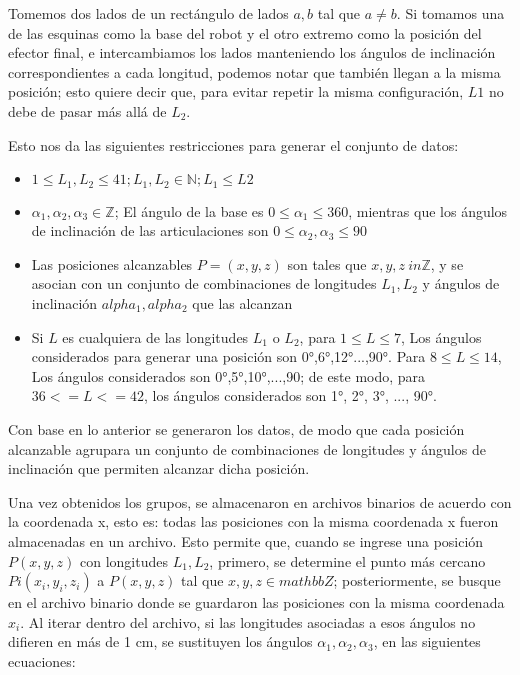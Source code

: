 Tomemos dos lados de un rectángulo de lados $a,b$ tal que $a \neq b$. Si tomamos una de las esquinas como la base del robot y el otro extremo como la posición del efector final, e intercambiamos los lados manteniendo los ángulos de inclinación correspondientes a cada longitud, podemos notar que también llegan a la misma posición; esto quiere decir que, para evitar repetir la misma configuración, $L1$ no debe de pasar más allá de $L_2$.

Esto nos da las siguientes restricciones para generar el conjunto de datos:

\begin{itemize}
	
	\item $ 1 \leq L_1, L_2 \leq 41; L_1, L_2 \in \mathbb{N}; L_1 \leq L2$ 
	
	\item $\alpha_1, \alpha_2, \alpha_3 \in \mathbb{Z}$; El ángulo de la base es $ 0 \leq \alpha_1 \leq 360$, mientras que los ángulos de inclinación de las articulaciones son $ 0 \leq \alpha_2, \alpha_3 \leq 90$
	
	\item Las posiciones alcanzables $P = (x, y, z)$ son tales que $x,y,z \ in \mathbb{Z}$, y se asocian con un conjunto de combinaciones de longitudes $L_1, L_2$ y ángulos de inclinación $alpha_1, alpha_2$ que las alcanzan
	
	\item Si $L$ es cualquiera de las longitudes $L_1$ o $L_2$, para $1 \leq L \leq 7$, Los ángulos considerados para generar una posición son 0°,6°,12°...,90°. Para $8 \leq L \leq 14$, Los ángulos considerados son 0°,5°,10°,...,90; de este modo, para $36 <= L <= 42$, los ángulos considerados son 1°, 2°, 3°, ..., 90°.
	
\end{itemize}

Con base en lo anterior se generaron los datos, de modo que cada posición alcanzable agrupara un conjunto de combinaciones de longitudes y ángulos de inclinación que permiten alcanzar dicha posición.

Una vez obtenidos los grupos, se almacenaron en archivos binarios de acuerdo con la coordenada x, esto es: todas las posiciones con la misma coordenada x fueron almacenadas en un archivo. Esto permite que, cuando se ingrese una posición $P(x,y,z)$ con longitudes $L_1, L_2$, primero, se determine el punto más cercano $Pi(x_i,y_i,z_i)$ a $P(x,y,z)$ tal que $x,y,z \in mathbb{Z}$; posteriormente, se busque en el archivo binario donde se guardaron las posiciones con la misma coordenada $x_i$. Al iterar dentro del archivo,  si las longitudes asociadas a esos ángulos no difieren en más de 1 cm, se sustituyen los ángulos $\alpha_1, \alpha_2, \alpha_3$, en las siguientes ecuaciones:

